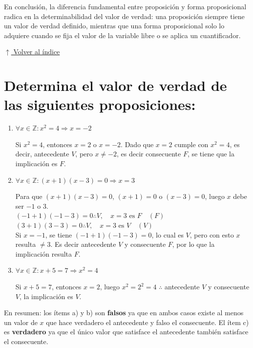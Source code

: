 \documentclass[12pt]{article}
\newcommand{\volverindice}{%
    \vspace{1em}%
    \begin{flushright}%
        \hyperlink{indice}{\small $\uparrow$ Volver al índice}%
    \end{flushright}%
}
\begin{document}
En conclusión, la diferencia fundamental entre proposición y forma proposicional radica en la determinabilidad del valor de verdad: una proposición siempre tiene un valor de verdad definido, mientras que una forma proposicional solo lo adquiere cuando se fija el valor de la variable libre o se aplica un cuantificador.

\volverindice
\newpage


\section[Valor de verdad de proposiciones cuantificadas]{Determina el valor de verdad de las siguientes proposiciones:}

\begin{enumerate}[label=\alph*.-]
    \item $\forall x \in \mathbb{Z}: x^2 = 4 \Rightarrow x = -2$

    Si $x^2 = 4$, entonces $x = 2$ o $x = -2$. Dado que $x = 2$ cumple con $x^2 = 4$, es decir, antecedente $V$, pero $x \neq -2$, es decir consecuente $F$, se tiene que la implicación es $F$.

    \item $\forall x \in \mathbb{Z}: (x+1)(x-3) = 0 \Rightarrow x = 3$

    Para que $(x+1)(x-3) = 0$, $(x+1) = 0$ o $(x-3) = 0$, luego $x$ debe ser $-1$ o $3$.\\
    $(-1+1)(-1-3) = 0 \therefore V, \quad x = 3 \text{ es } F \quad (F)$\\
    $(3+1)(3-3) = 0 \therefore V, \quad x = 3 \text{ es } V \quad (V)$\\
    Si $x = -1$, se tiene $(-1+1)(-1-3) = 0$, lo cual es $V$, pero con esto $x$ resulta $\neq 3$. Es decir antecedente $V$ y consecuente $F$, por lo que la implicación resulta $F$.

    \item $\forall x \in \mathbb{Z}: x + 5 = 7 \Rightarrow x^2 = 4$

    Si $x + 5 = 7$, entonces $x = 2$, luego $x^2 = 2^2 = 4$ $\therefore$ antecedente $V$ y consecuente $V$, la implicación es $V$.
\end{enumerate}

En resumen: los ítems a) y b) son \textbf{falsos} ya que en ambos casos existe al menos un valor de $x$ que hace verdadero el antecedente y falso el consecuente. El ítem c) es \textbf{verdadero} ya que el único valor que satisface el antecedente también satisface el consecuente.
\end{document}
